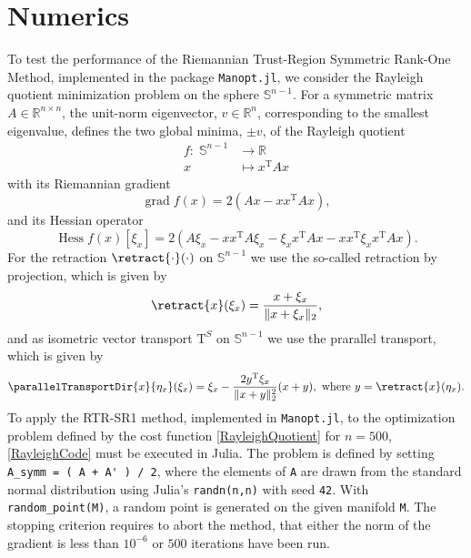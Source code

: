 \chapter{Numerics}

To test the performance of the Riemannian Trust-Region Symmetric Rank-One Method, implemented in the package \lstinline!Manopt.jl!, we consider the Rayleigh quotient minimization problem on the sphere $\mathbb{S}^{n-1}$. For a symmetric matrix $A \in \mathbb{R}^{n \times n}$, the unit-norm eigenvector, $v \in \mathbb{R}^n$, corresponding to the smallest eigenvalue, defines the two global minima, $\pm v$, of the Rayleigh quotient  
\begin{equation}\label{RayleighQuotient}
    \begin{split}
        f \colon \; \mathbb{S}^{n-1} & \to \mathbb{R} \\
        x & \mapsto x^{\mathrm{T}} A x 
    \end{split}
\end{equation}   
with its Riemannian gradient 
\begin{equation*}
    \operatorname{grad} f(x) = 2(Ax - x x^{\mathrm{T}} A x),
\end{equation*}
and its Hessian operator
\begin{equation}\label{RayleighHessian}
    \operatorname{Hess} f(x) [\xi_x] = 2 (A \xi_x - x x^{\mathrm{T}} A \xi_x - \xi_x x^{\mathrm{T}} A x - x x^{\mathrm{T}} \xi_x x^{\mathrm{T}} A x).
\end{equation}
For the retraction $\retract{\cdot}(\cdot)$ on $\mathbb{S}^{n-1}$ we use the so-called retraction by projection, which is given by
\begin{equation*}
    \retract{x}(\xi_x) = \frac{x + \xi_x}{\lVert x + \xi_x \rVert_2},
\end{equation*}
and as isometric vector transport $\mathrm{T}^S$ on $\mathbb{S}^{n-1}$ we use the prarallel transport, which is given by 
\begin{equation*}
    \parallelTransportDir{x}{\eta_x}(\xi_x) = \xi_x - \frac{2 y^{\mathrm{T}} \xi_x}{\lVert x + y \rVert^{2}_2} (x + y), \text{ where } y = \retract{x}(\eta_x).
\end{equation*}
To apply the RTR-SR1 method, implemented in \lstinline!Manopt.jl!, to the optimization problem defined by the cost function \cref{RayleighQuotient} for $n=500$, \cref{RayleighCode} must be executed in Julia. The problem is defined by setting \lstinline!A_symm = ( A + A' ) / 2!, where the elements of \lstinline!A! are drawn from the standard normal distribution using Julia’s \lstinline!randn(n,n)! with seed \lstinline!42!. With \lstinline!random_point(M)!, a random point is generated on the given manifold \lstinline!M!. The stopping criterion requires to abort the method, that either the norm of the gradient is less than $10^{-6}$ or $500$ iterations have been run. \\
